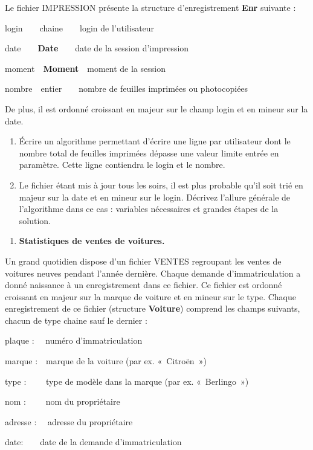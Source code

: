 {
Le fichier IMPRESSION présente la structure d’enregistrement
\textbf{Enr} suivante :}

{
login\ \ \ \ chaine\ \ \ \ login de l’utilisateur}

{
date\ \ \ \ \textbf{Date}\ \ \ \ date de la session d’impression }

{
moment\ \ \textbf{Moment}\ \ moment de la session}

{
nombre\ \ entier\ \ \ \ nombre de feuilles imprimées ou photocopiées}

{
De plus, il est ordonné croissant en majeur sur le champ login et en
mineur sur la date. }

\liststyleNumberingv
\begin{enumerate}
\item {
Écrire un algorithme permettant d'écrire une ligne par
utilisateur dont le nombre total de feuilles imprimées dépasse une
valeur limite entrée en paramètre. Cette ligne contiendra le login et
le nombre. }
\item {
Le fichier étant mis à jour tous les soirs, il est plus probable
qu'il soit trié en majeur sur la date et en mineur sur
le login. Décrivez l'allure générale de
l'algorithme dans ce cas : variables nécessaires et
grandes étapes de la solution.}
\end{enumerate}
\liststyleExercice
\begin{enumerate}
\item {\sffamily\bfseries
Statistiques de ventes de voitures.}
\end{enumerate}
{
Un grand quotidien dispose d’un fichier VENTES regroupant les ventes de
voitures neuves pendant l’année dernière. Chaque demande
d’immatriculation a donné naissance à un enregistrement dans ce
fichier. Ce fichier est ordonné croissant en majeur sur la marque de
voiture et en mineur sur le type. Chaque enregistrement de ce fichier
(structure \textbf{Voiture}) comprend les champs suivants, chacun de
type chaine sauf le dernier :}

{
plaque : \ \ numéro d’immatriculation}

{
marque :\ \ marque de la voiture (par ex. «~Citroën~»)}

{
type : \ \ \ \ type de modèle dans la marque (par ex. «~Berlingo~»)}

{
nom : \ \ \ \ nom du propriétaire}

{
adresse : \ \ adresse du propriétaire}

{
date:\ \ \ \ date de la demande d’immatriculation}

